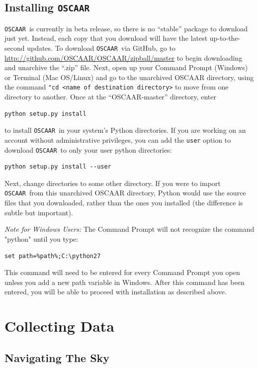 \documentclass[a4paper]{article}
\newcommand{\code}[1]{\texttt{#1}}
\newcommand{\oscaar}{\code{OSCAAR}~}
\begin{document}
\subsection{Installing \oscaar}
\oscaar is currently in beta release, so there is no ``stable'' package to download just yet. Instead, each copy that you download will have the latest up-to-the-second updates. To download \oscaar via GitHub, go to \href{https://github.com/OSCAAR/OSCAAR/zipball/master}{http://github.com/OSCAAR/OSCAAR/zipball/master} to begin downloading and unarchive the ``.zip'' file. Next, open up your Command Prompt (Windows) or Terminal (Mac OS/Linux) and go to the unarchived OSCAAR directory, using the command \code{"cd <name of destination directory>} to move from one directory to another. Once at the ``OSCAAR-master'' directory, enter 
\begin{verbatim}
python setup.py install
\end{verbatim}
\noindent to install \oscaar in your system's Python directories. If you are working on an account without administrative privileges, you can add the \code{user} option to download \oscaar to only your user python directories:
\begin{verbatim}
python setup.py install --user
\end{verbatim}
Next, change directories to some other directory. If you were to import \oscaar from this unarchived OSCAAR directory, Python would use the source files that you downloaded, rather than the ones you installed (the difference is subtle but important). 

\textit{Note for Windows Users:} The Command Prompt will not recognize the command "python" until you type:
\begin{verbatim}
set path=%path%;C:\python27
\end{verbatim}
This command will need to be entered for every Command Prompt you open unless you add a new path variable in Windows. After this command has been entered, you will be able to proceed with installation as described above.

\section{Collecting Data} \label{sec:collectingData}

\subsection{Navigating The Sky} \label{sec:nav}
\end{document}

